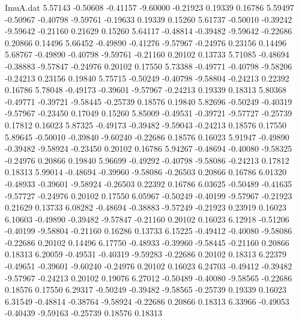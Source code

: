 \begin{filecontents}{ImuA.dat}
   5.57143   -0.50608   -0.41157   -9.60000   -0.21923    0.19339    0.16786
   5.59497   -0.50967   -0.40798   -9.59761   -0.19633    0.19339    0.15260
   5.61737   -0.50010   -0.39242   -9.59642   -0.21160    0.21629    0.15260
   5.64117   -0.48814   -0.39482   -9.59642   -0.22686    0.20866    0.14496
   5.66452   -0.49890   -0.41276   -9.57967   -0.24976    0.23156    0.14496
   5.68767   -0.49890   -0.40798   -9.59761   -0.21160    0.20102    0.13733
   5.71085   -0.48694   -0.38883   -9.57847   -0.24976    0.20102    0.17550
   5.73388   -0.49771   -0.40798   -9.58206   -0.24213    0.23156    0.19840
   5.75715   -0.50249   -0.40798   -9.58804   -0.24213    0.22392    0.16786
   5.78048   -0.49173   -0.39601   -9.57967   -0.24213    0.19339    0.18313
   5.80368   -0.49771   -0.39721   -9.58445   -0.25739    0.18576    0.19840
   5.82696   -0.50249   -0.40319   -9.57967   -0.23450    0.17049    0.15260
   5.85009   -0.49531   -0.39721   -9.57727   -0.25739    0.17812    0.16023
   5.87325   -0.49173   -0.39482   -9.59043   -0.24213    0.18576    0.17550
   5.89645   -0.50010   -0.39840   -9.60240   -0.22686    0.18576    0.16023
   5.91947   -0.49890   -0.39482   -9.58924   -0.23450    0.20102    0.16786
   5.94267   -0.48694   -0.40080   -9.58325   -0.24976    0.20866    0.19840
   5.96699   -0.49292   -0.40798   -9.58086   -0.24213    0.17812    0.18313
   5.99014   -0.48694   -0.39960   -9.58086   -0.26503    0.20866    0.16786
   6.01320   -0.48933   -0.39601   -9.58924   -0.26503    0.22392    0.16786
   6.03625   -0.50489   -0.41635   -9.57727   -0.24976    0.20102    0.17550
   6.05967   -0.50249   -0.40199   -9.57967   -0.21923    0.21629    0.13733
   6.08282   -0.48694   -0.38883   -9.57249   -0.21923    0.23919    0.16023
   6.10603   -0.49890   -0.39482   -9.57847   -0.21160    0.20102    0.16023
   6.12918   -0.51206   -0.40199   -9.58804   -0.21160    0.16286    0.13733
   6.15225   -0.49412   -0.40080   -9.58086   -0.22686    0.20102    0.14496
   6.17750   -0.48933   -0.39960   -9.58445   -0.21160    0.20866    0.18313
   6.20059   -0.49531   -0.40319   -9.59283   -0.22686    0.20102    0.18313
   6.22379   -0.49651   -0.39601   -9.60240   -0.24976    0.20102    0.16023
   6.24703   -0.49412   -0.39482   -9.57967   -0.24213    0.20102    0.19076
   6.27012   -0.50489   -0.40080   -9.58565   -0.22686    0.18576    0.17550
   6.29317   -0.50249   -0.39482   -9.58565   -0.25739    0.19339    0.16023
   6.31549   -0.48814   -0.38764   -9.58924   -0.22686    0.20866    0.18313
   6.33966   -0.49053   -0.40439   -9.59163   -0.25739    0.18576    0.18313

\end{filecontents}
